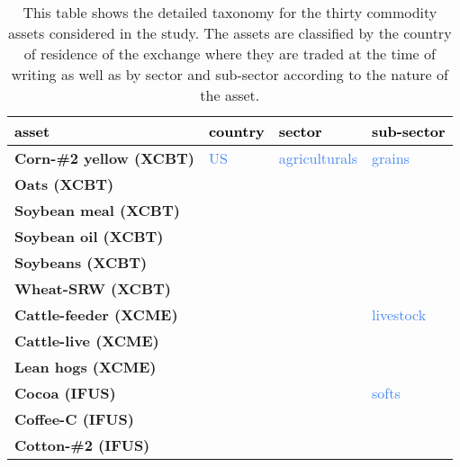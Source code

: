 \documentclass[
  authoryear,
  preprint,
  3p]{elsarticle}
\begin{document}
\begin{longtable}[t]{>{}l>{}l>{}l>{}l}

\caption{\label{tbl-assets-taxonomy}This table shows the detailed
taxonomy for the thirty commodity assets considered in the study. The
assets are classified by the country of residence of the exchange where
they are traded at the time of writing as well as by sector and
sub-sector according to the nature of the asset.}

\tabularnewline

\toprule
\textcolor{black}{\textbf{asset}} & \textcolor{black}{\textbf{country}} & \textcolor{black}{\textbf{sector}} & \textcolor{black}{\textbf{sub-sector}}\\
\midrule
\textbf{Corn-\#2 yellow (XCBT)} & \textcolor[HTML]{4285f4}{US} & \textcolor[HTML]{4285f4}{agriculturals} & \textcolor[HTML]{4285f4}{grains}\\
\textbf{Oats (XCBT)} & \textcolor[HTML]{4285f4}{} & \textcolor[HTML]{4285f4}{} & \textcolor[HTML]{4285f4}{}\\
\textbf{Soybean meal (XCBT)} & \textcolor[HTML]{4285f4}{} & \textcolor[HTML]{4285f4}{} & \textcolor[HTML]{4285f4}{}\\
\textbf{Soybean oil (XCBT)} & \textcolor[HTML]{4285f4}{} & \textcolor[HTML]{4285f4}{} & \textcolor[HTML]{4285f4}{}\\
\textbf{Soybeans (XCBT)} & \textcolor[HTML]{4285f4}{} & \textcolor[HTML]{4285f4}{} & \textcolor[HTML]{4285f4}{}\\
\addlinespace
\textbf{Wheat-SRW (XCBT)} & \textcolor[HTML]{4285f4}{} & \textcolor[HTML]{4285f4}{} & \textcolor[HTML]{4285f4}{}\\
\textbf{Cattle-feeder (XCME)} & \textcolor[HTML]{4285f4}{} & \textcolor[HTML]{4285f4}{} & \textcolor[HTML]{4285f4}{livestock}\\
\textbf{Cattle-live (XCME)} & \textcolor[HTML]{4285f4}{} & \textcolor[HTML]{4285f4}{} & \textcolor[HTML]{4285f4}{}\\
\textbf{Lean hogs (XCME)} & \textcolor[HTML]{4285f4}{} & \textcolor[HTML]{4285f4}{} & \textcolor[HTML]{4285f4}{}\\
\textbf{Cocoa (IFUS)} & \textcolor[HTML]{4285f4}{} & \textcolor[HTML]{4285f4}{} & \textcolor[HTML]{4285f4}{softs}\\
\addlinespace
\textbf{Coffee-C (IFUS)} & \textcolor[HTML]{4285f4}{} & \textcolor[HTML]{4285f4}{} & \textcolor[HTML]{4285f4}{}\\
\textbf{Cotton-\#2 (IFUS)} & \textcolor[HTML]{4285f4}{} & \textcolor[HTML]{4285f4}{} & \textcolor[HTML]{4285f4}{}\\

\end{longtable}
\end{document}
